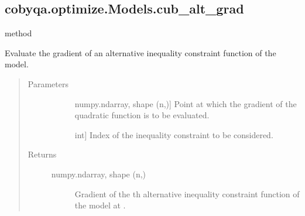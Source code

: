 \documentclass[letterpaper,10pt,english]{sphinxmanual}
\begin{document}
\begin{fulllineitems}
\begin{fulllineitems}
\begin{quote}
\begin{description}
\end{description}\end{quote}

\end{fulllineitems}



\subsection{cobyqa.optimize.Models.cub\_alt\_grad}
\label{\detokenize{refs/generated/cobyqa.optimize.Models.cub_alt_grad:cobyqa-optimize-models-cub-alt-grad}}\label{\detokenize{refs/generated/cobyqa.optimize.Models.cub_alt_grad::doc}}
\sphinxAtStartPar
method

\begin{fulllineitems}
\label{\detokenize{refs/generated/cobyqa.optimize.Models.cub_alt_grad:cobyqa.optimize.Models.cub_alt_grad}}
\sphinxAtStartPar
Evaluate the gradient of an alternative inequality constraint function
of the model.
\begin{quote}\begin{description}
\item[{Parameters}] \leavevmode\begin{description}
\item[{}] \leavevmode{[}numpy.ndarray, shape (n,){]}
\sphinxAtStartPar
Point at which the gradient of the quadratic function is to be
evaluated.

\item[{}] \leavevmode{[}int{]}
\sphinxAtStartPar
Index of the inequality constraint to be considered.

\end{description}

\item[{Returns}] \leavevmode\begin{description}
\item[{numpy.ndarray, shape (n,)}] \leavevmode
\sphinxAtStartPar
Gradient of the \sphinxhyphen{}th alternative inequality constraint function of
the model at .

\end{description}


\end{description}
\end{quote}
\end{fulllineitems}
\end{fulllineitems}
\end{document}
